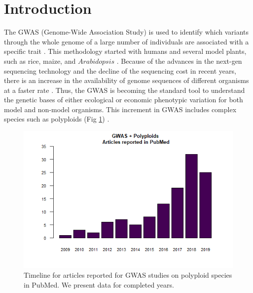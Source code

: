 \documentclass{article}
\begin{document}
\section{Introduction}


The GWAS (Genome-Wide Association Study) is used to identify which variants through the whole genome of a large number of individuals are associated with a specific trait \cite{cantor2010prioritizing, begum2012comprehensive}. This methodology started with humans and several model plants, such as rice, maize, and $Arabidopsis$ \cite{lauc2010genomics, tian2011genome, cao2011whole, korte2013advantages, han2013sequencing}. Because of the advances in the next-gen sequencing technology and the decline of the sequencing cost in recent years, there is an increase in the availability of genome sequences of different organisms at a faster rate \cite{ekblom2011applications, ellegren2014genome}. Thus, the GWAS is becoming the standard tool to understand the genetic bases of either ecological or economic phenotypic variation for both model and non-model organisms. This increment in GWAS includes complex species such as polyploids (Fig \ref{GWASpolyploids}) \cite{ekblom2011applications, santure2018wild}. 

\begin{figure}
\begin{center}
    
\includegraphics[width=12cm]{images/GWASpolyploids.png}

\caption{Timeline for articles reported for GWAS studies on polyploid species in PubMed. We present data for completed years.\label{GWASpolyploids}}
\end{center}

\end{figure}
\end{document}
